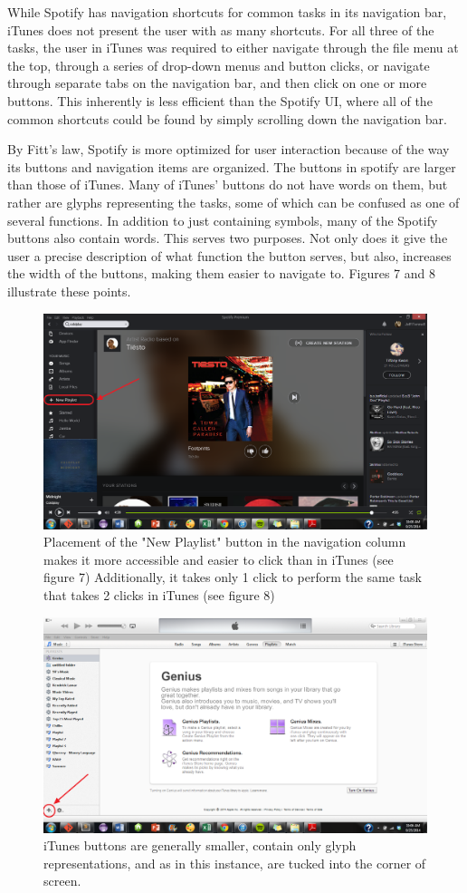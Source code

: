 \documentclass[12pt]{report}
\begin{document}
While Spotify has navigation shortcuts for common tasks in its navigation bar, iTunes does not present the user with as many shortcuts. For all three of the tasks, the user in iTunes was required to either navigate through the file menu at the top, through a series of drop-down menus and button clicks, or navigate through separate tabs on the navigation bar, and then click on one or more buttons. This inherently is less efficient than the Spotify UI, where all of the common shortcuts could be found by simply scrolling down the navigation bar. 

By Fitt's law, Spotify is more optimized for user interaction because of the way its buttons and navigation items are organized. The buttons in spotify are larger than those of iTunes. Many of iTunes' buttons do not have words on them, but rather are glyphs representing the tasks, some of which can be confused as one of several functions. In addition to just containing symbols, many of the Spotify buttons also contain words. This serves two purposes. Not only does it give the user a precise description of what function the button serves, but also, increases the width of the buttons, making them easier to navigate to. Figures 7 and 8 illustrate these points.

\begin{figure}[H]
	\centering
	\includegraphics[width=.75\textwidth]{chart8.png}
	\caption{Placement of the "New Playlist" button in the navigation column makes it more accessible and easier to click than in iTunes (see figure 7) Additionally, it takes only 1 click to perform the same task that takes 2 clicks in iTunes (see figure 8)}
\end{figure}

\begin{figure}[H]
	\centering
	\includegraphics[width=.75\textwidth]{chart7.png}
	\caption{iTunes buttons are generally smaller, contain only glyph representations, and as in this instance, are tucked into the corner of screen.}
\end{figure}
\end{document}

